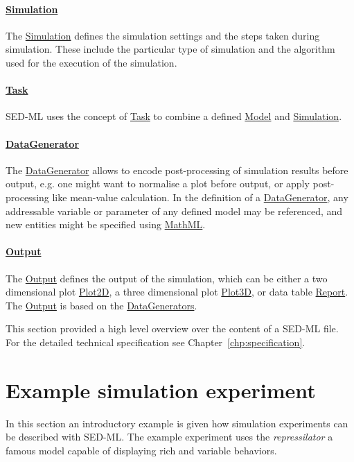 \paragraph*{\hyperref[class:simulation]{Simulation}}
The \hyperref[class:simulation]{Simulation} defines the simulation settings and the steps taken during simulation. These include the particular type of simulation and the algorithm used for the execution of the simulation.

\paragraph*{\hyperref[class:task]{Task}}
SED-ML uses the concept of \hyperref[class:task]{Task} to combine a defined \hyperref[class:model]{Model} and \hyperref[class:simulation]{Simulation}.

\paragraph*{\hyperref[class:dataGenerator]{DataGenerator}}
The \hyperref[class:dataGenerator]{DataGenerator} allows to encode post-processing of simulation results before output, e.g. one might want to normalise a plot before output, or apply post-processing like mean-value calculation. In the definition of a \hyperref[class:dataGenerator]{DataGenerator}, any addressable variable or parameter of any defined model may be referenced, and new entities might be specified using \hyperref[sec:mathML]{MathML}.

\paragraph*{\hyperref[class:output]{Output}}
The \hyperref[class:output]{Output} defines the output of the simulation, which can be either a two dimensional plot \hyperref[class:plot2D]{Plot2D}, a three dimensional plot \hyperref[class:plot3D]{Plot3D}, or data table \hyperref[class:report]{Report}. The \hyperref[class:output]{Output} is based on the \hyperref[class:dataGenerator]{DataGenerators}.

This section provided a high level overview over the content of a SED-ML file. For the detailed technical specification see Chapter~\ref{chp:specification}. 

\section{Example simulation experiment}
\label{motivation:example}
In this section an introductory example is given how simulation experiments can be described with SED-ML. The example experiment uses the \emph{repressilator} \citep{Elowitz:2000} a famous model capable of displaying rich and variable behaviors.

